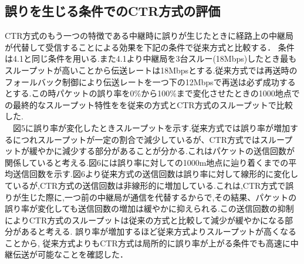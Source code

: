 \documentclass[a4paper,10pt]{ltjsarticle}
\begin{document}
\subsection{誤りを生じる条件でのCTR方式の評価}
CTR方式のもう一つの特徴である中継時に誤りが生じたときに経路上の中継局が代替して受信することによる効果を下記の条件で従来方式と比較する．
条件は4.1と同じ条件を用いる.また4.1より中継局を3台スルー(18Mbps)したとき最もスループットが高いことから伝送レートは18Mbpsとする.従来方式では再送時のフォールバック制御により伝送レートを一つ下の12Mbpsで再送は必ず成功するとする.この時パケットの誤り率を0\%から100\%まで変化させたときの1000地点での最終的なスループット特性をを従来の方式とCTR方式のスループットで比較した.
\\　図5に誤り率が変化したときスループットを示す.従来方式では誤り率が増加するにつれスループットが一定の割合で減少しているが、CTR方式ではスループットが緩やかに減少する部分があることが分かる.これはパケットの送信回数が関係していると考える.図6には誤り率に対しての1000m地点に辿り着くまでの平均送信回数を示す.図6より従来方式の送信回数は誤り率に対して線形的に変化しているが,CTR方式の送信回数は非線形的に増加している.これは,CTR方式で誤りが生じた際に,一つ前の中継局が通信を代替するからで,その結果、パケットの誤り率が変化しても送信回数の増加は緩やかに抑えられる.この送信回数の抑制によりCTR方式のスループットは従来の方式と比較して減少が緩やかになる部分があると考える. 誤り率が増加するほど従来方式よりスループットが高くなることから, 従来方式よりもCTR方式は局所的に誤り率が上がる条件でも高速に中継伝送が可能なことを確認した．
\end{document}
